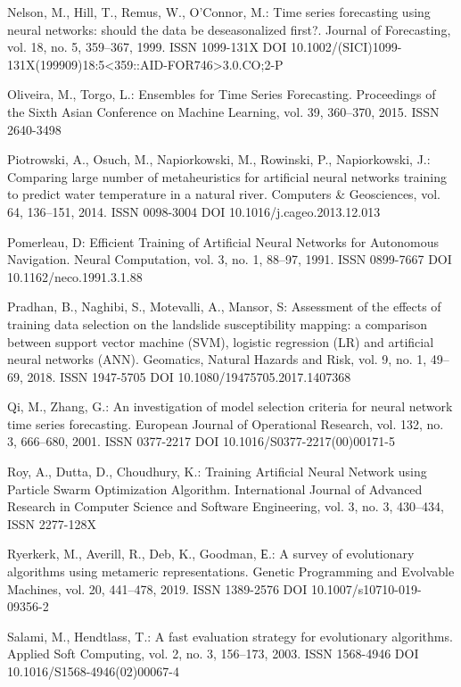 \begin{thebibliography}{99.}
 Nelson, M., Hill, T., Remus, W., O'Connor, M.: Time series forecasting using neural networks: should the data be deseasonalized first?. Journal of Forecasting, vol. 18, no. 5, 359--367, 1999. ISSN 1099-131X DOI 10.1002/(SICI)1099-131X(199909)18:5<359::AID-FOR746>3.0.CO;2-P

 Oliveira, M., Torgo, L.: Ensembles for Time Series Forecasting. Proceedings of the Sixth Asian Conference on Machine Learning, vol. 39, 360--370, 2015. ISSN 2640-3498

 Piotrowski, A., Osuch, M., Napiorkowski, M., Rowinski, P., Napiorkowski, J.: Comparing large number of metaheuristics for artificial neural networks training to predict water temperature in a natural river. Computers \& Geosciences, vol. 64, 136--151, 2014. ISSN 0098-3004 DOI 10.1016/j.cageo.2013.12.013

 Pomerleau, D: Efficient Training of Artificial Neural Networks for Autonomous Navigation. Neural Computation, vol. 3, no. 1, 88--97, 1991. ISSN 0899-7667 DOI 10.1162/neco.1991.3.1.88

 Pradhan, B., Naghibi, S., Motevalli, A., Mansor, S: Assessment of the effects of training data selection on the landslide susceptibility mapping: a comparison between support vector machine (SVM), logistic regression (LR) and artificial neural networks (ANN). Geomatics, Natural Hazards and Risk, vol. 9, no. 1, 49--69, 2018. ISSN 1947-5705 DOI 10.1080/19475705.2017.1407368

 Qi, M., Zhang, G.: An investigation of model selection criteria for neural network time series forecasting. European Journal of Operational Research, vol. 132, no. 3, 666--680, 2001. ISSN 0377-2217 DOI 10.1016/S0377-2217(00)00171-5

 Roy, A., Dutta, D., Choudhury, K.: Training Artificial Neural Network using Particle Swarm Optimization Algorithm. International Journal of Advanced Research in Computer Science and Software Engineering, vol. 3, no. 3, 430--434, ISSN 2277-128X

 Ryerkerk, M., Averill, R., Deb, K., Goodman, Е.: A survey of evolutionary algorithms using metameric representations. Genetic Programming and Evolvable Machines, vol. 20, 441--478, 2019. ISSN 1389-2576 DOI 10.1007/s10710-019-09356-2

 Salami, M., Hendtlass, T.: A fast evaluation strategy for evolutionary algorithms. Applied Soft Computing, vol. 2, no. 3, 156--173, 2003. ISSN 1568-4946 DOI 10.1016/S1568-4946(02)00067-4


\end{thebibliography}
